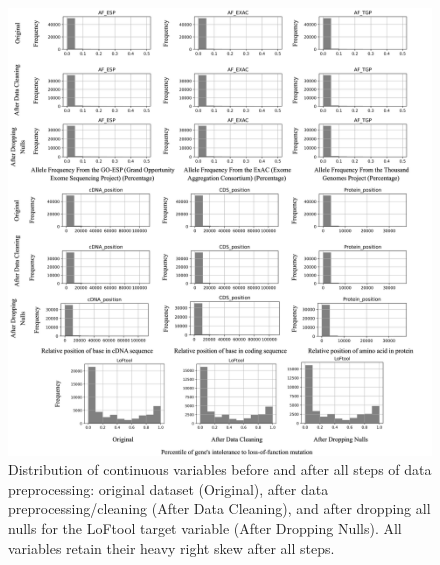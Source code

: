 \documentclass[journal,twoside,web]{ieeecolor}
\begin{document}
\clearpage
\begin{figure}[!t]
\centering
\includegraphics[width=\textwidth]{supplementary_kaur2.png}
\caption{Distribution of continuous variables before and after all steps of data preprocessing: original dataset (Original), after data preprocessing/cleaning (After Data Cleaning), and after dropping all nulls for the LoFtool target variable (After Dropping Nulls). All variables retain their heavy right skew after all steps.}
\label{fig2}
\end{figure}
\end{document}
